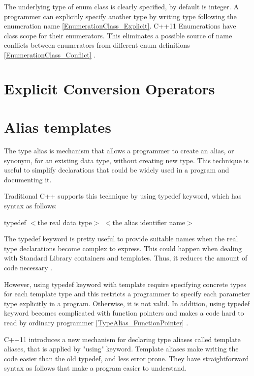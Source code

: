\documentclass[11pt]{report}
\begin{document}
The underlying type of enum class is clearly specified, by default is integer.  A programmer can explicitly specify another type by writing type following the enumeration name \ref{EnumerationClass_Explicit}. C++11 Enumerations have class scope for their enumerators. This eliminates a possible source of name conflicts between enumerators from different enum definitions \ref{EnumerationClass_Conflict} \cite{Josuttis:2012:CppStandard Library}.


\section{Explicit Conversion Operators}
\label{section: Explicit Conversion Operators}

\section{Alias templates}
\label{section: Alias templates}
The type alias is mechanism that allows a programmer to create an alias, or synonym, for an existing data type, without creating new type.  This technique is useful to simplify declarations that could be widely used in a program and documenting it.
\newline

Traditional C++ supports this technique by using typedef keyword, which has syntax as follows:
\begin{center}
 typedef $<$the real data type$>$ $<$the alias identifier name$>$
\end{center}

The typedef keyword is pretty useful to provide suitable names when the real type declarations become complex to express. This could happen when dealing with Standard Library containers and templates. Thus, it reduces the amount of code necessary \cite{Gregorie:professionalcpp}.
\newline

However, using typedef keyword with template require specifying concrete types for each template type and this restricts a programmer to specify each parameter type explicitly in a program. Otherwise, it is not valid. In addition, using typedef keyword becomes complicated with function pointers and makes a code hard to read by ordinary programmer \ref{TypeAlias_FunctionPointer} \cite{Gregorie:professionalcpp}.
\newline

C++11 introduces a new mechanism for declaring type aliases called template aliases, that is applied by "using" keyword.  Template aliases make writing the code easier than the old typedef, and less error prone. They have straightforward syntax as follows that make a program easier to understand.
\end{document}
